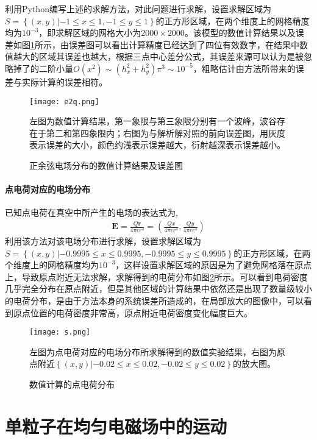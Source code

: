 \documentclass{article} %
\renewcommand{\vec}[1]{\boldsymbol{#1}} %
\begin{document}
利用Python编写上述的求解方法，对此问题进行求解，设置求解区域为$S=\left\{(x,y)|-1\leq x\leq 1,-1\leq y\leq 1\right\}$的正方形区域，在两个维度上的网格精度均为$10^{-3}$，即求解区域的网格大小为$2000\times 2000$。该模型的数值计算结果以及误差如图\ref{F1}所示，由误差图可以看出计算精度已经达到了四位有效数字，在结果中数值越大的区域其误差也越大，根据三点中心差分公式，其误差来源可以认为是被忽略掉了的二阶小量$O(x^2)\sim (h_x^2+h_y^2)\pi^3 \sim 10^{-5}$，粗略估计由方法所带来的误差与实际计算的误差相符。
\begin{figure}
    \begin{center}
        \texttt{[image: e2q.png]}
    \end{center}
    \qquad 左图为数值计算结果，第一象限与第三象限分别有一个波峰，波谷存在于第二和第四象限内；右图为与解析解对照的前向误差图，用灰度表示误差的大小，颜色约浅表示误差越大，衍射越深表示误差越小。
    \caption{正余弦电场分布的数值计算结果及误差图}
    \label{F1}
\end{figure}

\subsection{点电荷对应的电场分布}
已知点电荷在真空中所产生的电场的表达式为,
\begin{align}
    \vec{E}=\frac{Q \vec{r}}{4\pi \epsilon r^3}=(\frac{Qx}{4\pi \epsilon r^3},\frac{Qy}{4\pi \epsilon r^3})
\end{align}
利用该方法对该电场分布进行求解，设置求解区域为$S=\left\{(x,y)|-0.9995\leq x\leq 0.9995,-0.9995\leq y\leq 0.9995\right\}$的正方形区域，在两个维度上的网格精度均为$10^{-3}$，这样设置求解区域的原因是为了避免网格落在原点上，导致原点附近无法求解，求解得到的电荷分布如图\ref{F1.1}所示。可以看到电荷密度几乎完全分布在原点附近，但是其他区域的计算结果中依然还是出现了数量级较小的电荷分布，是由于方法本身的系统误差所造成的，在局部放大的图像中，可以看到原点位置的电荷密度非常高，原点附近电荷密度变化幅度巨大。
\begin{figure}
    \begin{center}
        \texttt{[image: s.png]}
    \end{center}
    \qquad 左图为点电荷对应的电场分布所求解得到的数值实验结果，右图为原点附近$\left\{(x,y)|-0.02\leq x\leq 0.02,-0.02\leq y\leq 0.02\right\}$的放大图。
    \caption{数值计算的点电荷分布}
    \label{F1.1}
\end{figure}

\part{单粒子在均匀电磁场中的运动}
\end{document}

